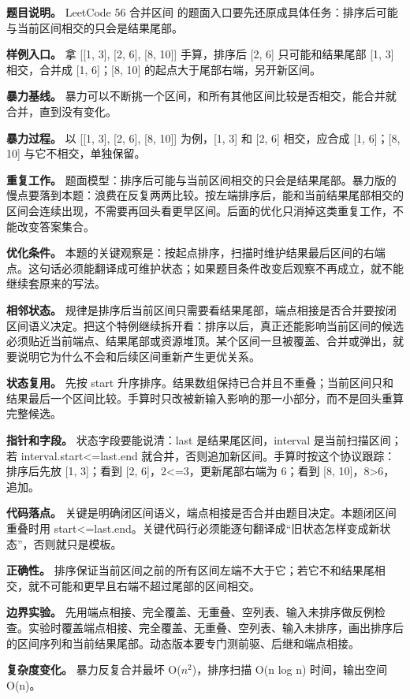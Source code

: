 \textbf{题目说明。} LeetCode 56 合并区间 的题面入口要先还原成具体任务：排序后可能与当前区间相交的只会是结果尾部。

\textbf{样例入口。} 拿 [[1, 3], [2, 6], [8, 10]] 手算，排序后 [2, 6] 只可能和结果尾部 [1, 3] 相交，合并成 [1, 6]；[8, 10] 的起点大于尾部右端，另开新区间。

\textbf{暴力基线。} 暴力可以不断挑一个区间，和所有其他区间比较是否相交，能合并就合并，直到没有变化。

\textbf{暴力过程。} 以 [[1, 3], [2, 6], [8, 10]] 为例，[1, 3] 和 [2, 6] 相交，应合成 [1, 6]；[8, 10] 与它不相交，单独保留。

\textbf{重复工作。} 题面模型：排序后可能与当前区间相交的只会是结果尾部。暴力版的慢点要落到本题：浪费在反复两两比较。按左端排序后，能和当前结果尾部相交的区间会连续出现，不需要再回头看更早区间。后面的优化只消掉这类重复工作，不能改变答案集合。

\textbf{优化条件。} 本题的关键观察是：按起点排序，扫描时维护结果最后区间的右端点。这句话必须能翻译成可维护状态；如果题目条件改变后观察不再成立，就不能继续套原来的写法。

\textbf{相邻状态。} 规律是排序后当前区间只需要看结果尾部，端点相接是否合并要按闭区间语义决定。把这个特例继续拆开看：排序以后，真正还能影响当前区间的候选必须贴近当前端点、结果尾部或资源堆顶。某个区间一旦被覆盖、合并或弹出，就要说明它为什么不会和后续区间重新产生更优关系。

\textbf{状态复用。} 先按 start 升序排序。结果数组保持已合并且不重叠；当前区间只和结果最后一个区间比较。手算时只改被新输入影响的那一小部分，而不是回头重算完整候选。

\textbf{指针和字段。} 状态字段要能说清：last 是结果尾区间，interval 是当前扫描区间；若 interval.start<=last.end 就合并，否则追加新区间。手算时按这个协议跟踪：排序后先放 [1, 3]；看到 [2, 6]，2<=3，更新尾部右端为 6；看到 [8, 10]，8>6，追加。

\textbf{代码落点。} 关键是明确闭区间语义，端点相接是否合并由题目决定。本题闭区间重叠时用 start<=last.end。关键代码行必须能逐句翻译成“旧状态怎样变成新状态”，否则就只是模板。

\textbf{正确性。} 排序保证当前区间之前的所有区间左端不大于它；若它不和结果尾相交，就不可能和更早且右端不超过尾部的区间相交。

\textbf{边界实验。} 先用端点相接、完全覆盖、无重叠、空列表、输入未排序做反例检查。实验时覆盖端点相接、完全覆盖、无重叠、空列表、输入未排序，画出排序后的区间序列和当前结果尾部。动态版本要专门测前驱、后继和端点相接。

\textbf{复杂度变化。} 暴力反复合并最坏 O(\ensuremath{n^{2}})，排序扫描 O(n log n) 时间，输出空间 O(n)。

